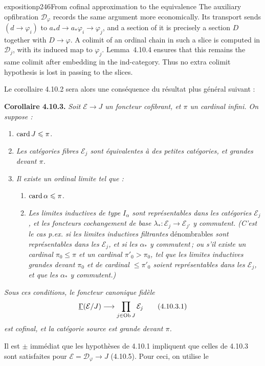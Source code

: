 \begin{dcomment}{exposition}{p246}{From cofinal approximation to the equivalence}
The auxiliary opfibration $\mathcal D_\varphi$ records the same argument more economically. Its transport sends $(d\to\varphi_i)$ to $a_*d\to a_*\varphi_i\to\varphi_j$, and a section of it is precisely a section $D$ together with $D\to\varphi$. A colimit of an ordinal chain in such a slice is computed in $\mathcal D_j$, with its induced map to $\varphi_j$. Lemma~4.10.4 ensures that this remains the same colimit after embedding in the ind-category. Thus no extra colimit hypothesis is lost in passing to the slices.
\end{dcomment}


Le corollaire 4.10.2 sera alors une conséquence du résultat plus général suivant :

\textbf{Corollaire 4.10.3.} \textit{Soit $\mathcal{E} \longrightarrow J$ un foncteur cofibrant, et $\pi$ un cardinal infini. On suppose :}
\begin{enumerate}[label={}, leftmargin=3em]
\item[\textit{a)}] $\operatorname{card} J \leqslant \pi$.
\item[\textit{b)}] \textit{Les catégories fibres $\mathcal{E}_j$ sont équivalentes à des petites catégories, et grandes devant $\pi$.}
\item[\textit{c)}] \textit{Il existe un ordinal limite tel que :}
\begin{enumerate}[label={}, leftmargin=3em]
\item[\textit{1°)}] $\operatorname{card} \alpha \leqslant \pi$.
\item[\textit{2°)}] \textit{Les limites inductives de type $I_\alpha$ sont représentables dans les catégories $\mathcal{E}_j$, et les foncteurs cochangement de base $\lambda_* : \mathcal{E}_j \longrightarrow \mathcal{E}_{j'}$ y commutent. (C'est le cas p.ex. si les limites inductives filtrantes} dénombrables \textit{sont représentables dans les $\mathcal{E}_j$, et si les $\alpha_*$ y commutent\,; ou s'il existe un cardinal $\pi_0 \leqslant \pi$ et un cardinal $\pi'_0 > \pi_0$, tel que les limites inductives grandes devant $\pi_0$ et de cardinal $\leqslant \pi'_0$ soient représentables dans les $\mathcal{E}_j$, et que les $\alpha_*$ y commutent.)}
\end{enumerate}
\end{enumerate}
\textit{Sous ces conditions, le foncteur canonique fidèle}
\[
\uGamma(\mathcal{E}/J) \longrightarrow \prod_{j\in\Ob J} \mathcal{E}_j \tag*{(4.10.3.1)}
\]
\textit{est cofinal, et la catégorie source est grande devant $\pi$.}

Il est $\pm$ immédiat que les hypothèses de 4.10.1 impliquent que celles de 4.10.3 sont satisfaites pour $\mathcal{E} = \mathcal{D}_\varphi \longrightarrow J$ (4.10.5). Pour
ceci, on utilise le

